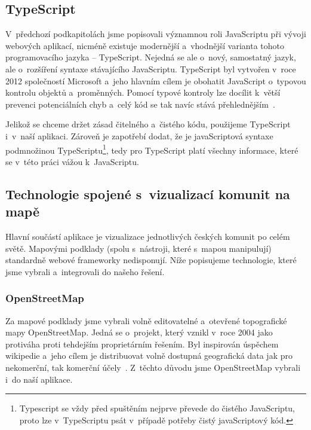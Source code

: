 \hypertarget{typescript}{%
\subsection{TypeScript}\label{typescript}}

V~předchozí podkapitolách jsme popisovali významnou roli JavaScriptu při vývoji webových aplikací, nicméně existuje modernější a~vhodnější varianta tohoto programovacího jazyka -- TypeScript. Nejedná se ale o~nový, samostatný jazyk, ale o~rozšíření syntaxe stávajícího JavaScriptu. TypeScript byl vytvořen v~roce 2012 společností Microsoft a~jeho hlavním cílem je obohatit JavaScript o~typovou kontrolu objektů a~proměnných. Pomocí typové kontroly lze docílit k~větší prevenci potenciálních chyb a~celý kód se tak navíc stává přehlednějším~\parencite{typescript}.

Jelikož se chceme držet zásad čitelného a~čistého kódu, použijeme TypeScript i~v~naší aplikaci. Zároveň je zapotřebí dodat, že je javaScriptová syntaxe podmnožinou TypeScriptu\footnote{Typescript se vždy před spuštěním nejprve převede do čistého JavaScriptu, proto lze v~TypeScriptu psát v~případě potřeby čistý javaScriptový kód.}, tedy pro TypeScript platí všechny informace, které se v~této práci vážou k~JavaScriptu.

\hypertarget{technologie-spojenuxe9-s-vizualizacuxed-komunit-na-mapux11b}{%
\subsection{Technologie spojené s~vizualizací komunit na mapě}\label{technologie-spojenuxe9-s-vizualizacuxed-komunit-na-mapux11b}}

Hlavní součástí aplikace je vizualizace jednotlivých českých komunit po celém světě. Mapovými podklady (spolu s~nástroji, které s~mapou manipulují) standardně webové frameworky nedisponují. Níže popisujeme technologie, které jsme vybrali a~integrovali do našeho řešení.

\hypertarget{openstreetmap}{%
\subsubsection{OpenStreetMap}\label{openstreetmap}}

Za mapové podklady jsme vybrali volně editovatelné a~otevřené topografické mapy OpenStreetMap. Jedná se o~projekt, který vznikl v~roce 2004 jako protiváha proti tehdejším proprietárním řešením. Byl inspirován úspěchem wikipedie a~jeho cílem je distribuovat volně dostupná geografická data jak pro nekomerční, tak komerční účely~\parencite{open-street}. Z~těchto důvodu jsme OpenStreetMap vybrali i~do naší aplikace.

